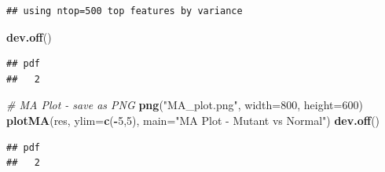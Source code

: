 \documentclass[
]{article}
\newenvironment{Shaded}{\begin{snugshade}}{\end{snugshade}}
\newcommand{\AttributeTok}[1]{\textcolor[rgb]{0.13,0.29,0.53}{#1}}
\newcommand{\CommentTok}[1]{\textcolor[rgb]{0.56,0.35,0.01}{\textit{#1}}}
\newcommand{\DecValTok}[1]{\textcolor[rgb]{0.00,0.00,0.81}{#1}}
\newcommand{\FunctionTok}[1]{\textcolor[rgb]{0.13,0.29,0.53}{\textbf{#1}}}
\newcommand{\NormalTok}[1]{#1}
\newcommand{\SpecialCharTok}[1]{\textcolor[rgb]{0.81,0.36,0.00}{\textbf{#1}}}
\newcommand{\StringTok}[1]{\textcolor[rgb]{0.31,0.60,0.02}{#1}}
\begin{document}
\begin{verbatim}
## using ntop=500 top features by variance
\end{verbatim}

\begin{Shaded}
\begin{Highlighting}[]
\FunctionTok{dev.off}\NormalTok{()}
\end{Highlighting}
\end{Shaded}

\begin{verbatim}
## pdf 
##   2
\end{verbatim}

\begin{Shaded}
\begin{Highlighting}[]
\CommentTok{\# MA Plot {-} save as PNG}
\FunctionTok{png}\NormalTok{(}\StringTok{"MA\_plot.png"}\NormalTok{,}
    \AttributeTok{width=}\DecValTok{800}\NormalTok{, }\AttributeTok{height=}\DecValTok{600}\NormalTok{)}
\FunctionTok{plotMA}\NormalTok{(res, }\AttributeTok{ylim=}\FunctionTok{c}\NormalTok{(}\SpecialCharTok{{-}}\DecValTok{5}\NormalTok{,}\DecValTok{5}\NormalTok{),}
       \AttributeTok{main=}\StringTok{"MA Plot {-} Mutant vs Normal"}\NormalTok{)}
\FunctionTok{dev.off}\NormalTok{()}
\end{Highlighting}
\end{Shaded}

\begin{verbatim}
## pdf 
##   2
\end{verbatim}
\end{document}
